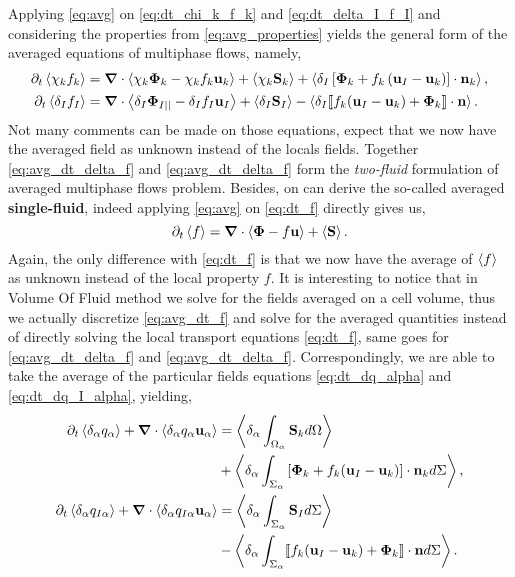 Applying \ref{eq:avg} on \ref{eq:dt_chi_k_f_k} and \ref{eq:dt_delta_I_f_I} and considering the properties from \ref{eq:avg_properties} yields the general form of the averaged equations of multiphase flows, namely,
\begin{align}
    \partial_t \left<\chi_k f_k\right>
    &= \bm{\nabla} \cdot \left<\chi_k \bm{\Phi}_k - \chi_k f_k \textbf{u}_k\right>
    + \left<\chi_k \textbf{S}_k\right>
    + \left<\delta_I\left[
        \bm{\Phi}_k
        + f_k
        \left(
            \textbf{u}_I
            - \textbf{u}_k
        \right)
    \right]
    \cdot \textbf{n}_k\right> ,
    \label{eq:avg_dt_chi_f}\\
    \partial_t \left<\delta_If_I\right>
    &= 
    \bm{\nabla} \cdot \left<\delta_I \mathbf{\Phi}_{I||} - \delta_I f_I \textbf{u}_I\right>
    +\left<\delta_I\textbf{S}_I\right> 
    - \left<\delta_I \llbracket 
    f_k (\textbf{u}_I - \textbf{u}_k)
    + \mathbf{\Phi}_k
     \rrbracket \cdot \textbf{n} \right>.
    \label{eq:avg_dt_delta_f}
\end{align}
Not many comments can be made on those equations, expect that we now have the averaged field as unknown instead of the locals fields. 
Together \ref{eq:avg_dt_delta_f}  and \ref{eq:avg_dt_delta_f} form the \textit{two-fluid} formulation of averaged multiphase flows problem. 
Besides, on can derive the so-called averaged \textbf{single-fluid}, indeed applying \ref{eq:avg} on \ref{eq:dt_f} directly gives us, 
\begin{equation}
    \partial_t \left<f\right>
    = \bm{\nabla} \cdot \left<\bm{\Phi} - f \textbf{u}\right>
    + \left<\textbf{S}\right>.
    \label{eq:avg_dt_f}
\end{equation}
Again, the only difference with \ref{eq:dt_f} is that we now have the average of $\left<f\right>$ as unknown instead of the local property $f$. 
It is interesting to notice that in Volume Of Fluid method we solve for the fields averaged on a cell volume, thus we actually discretize \ref{eq:avg_dt_f} and solve for the averaged quantities \citep{tryggvason2011direct} instead of directly solving the local transport equations \ref{eq:dt_f}, same goes for \ref{eq:avg_dt_delta_f} and \ref{eq:avg_dt_delta_f}.
Correspondingly, we are able to take the average of the particular fields equations \ref{eq:dt_dq_alpha} and \ref{eq:dt_dq_I_alpha}, yielding, 
\begin{align}
    \partial_t \left<\delta_\alpha  q_\alpha\right>
    + \bm{\nabla}\cdot \left<\delta_\alpha  q_\alpha \textbf{u}_\alpha\right>
    &= \left<\delta_\alpha \int_{\Omega_\alpha} \textbf{S}_k d\Omega\right>\nonumber\\
    &+ \left<\delta_\alpha \int_{\Sigma_\alpha} \left[\bm{\Phi}_k + f_k (\textbf{u}_I-\textbf{u}_k) \right] \cdot \textbf{n}_k d\Sigma\right>,
    \label{eq:avg_dt_dq_alpha}\\
    \partial_t \left<\delta_\alpha  q_{I\alpha}\right>
    + \bm{\nabla}\cdot \left<\delta_\alpha  q_{I\alpha} \textbf{u}_\alpha\right>
    &= \left<\delta_\alpha \int_{\Sigma_\alpha} 
        \textbf{S}_I
    d\Sigma\right>\nonumber\\
    &- \left<\delta_\alpha \int_{\Sigma_\alpha} \llbracket 
        f_k (\textbf{u}_I - \textbf{u}_k)
        + \mathbf{\Phi}_k
     \rrbracket \cdot \textbf{n}
    d\Sigma\right>.
    \label{eq:avg_dt_dq_I_alpha}
\end{align}
